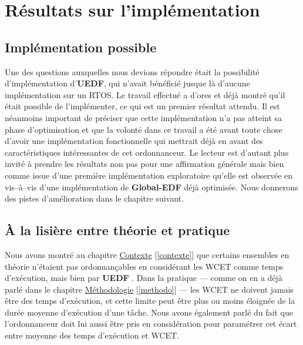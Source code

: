 
\section{Résultats sur l'implémentation}
\label{resultats}

	\subsection{Implémentation possible}
	
	Une des questions auxquelles nous devions répondre était la possibilité d'implémentation d'\textbf{UEDF}, qui 
	n'avait bénéficié jusque là d'aucune implémentation sur un RTOS.
	Le travail effectué a d'ores et déjà montré qu'il était possible de l'implémenter, ce qui est un premier résultat attendu.
	Il est néanmoins important de préciser que cette implémentation n'a pas atteint sa phase d'optimisation 
	et que la volonté dans ce travail a été avant toute chose d'avoir une implémentation fonctionnelle qui mettrait
	déjà en avant des caractéristiques intéressantes de cet ordonnanceur. 
	Le lecteur est d'autant plus invité à prendre les résultats non pas pour une affirmation générale 
	mais bien comme issue d'une première implémentation 
	\og{}exploratoire\fg{} qu'elle est observée en vis--à--vis d'une implémentation de \textbf{Global-EDF} déjà optimisée. 
	Nous donnerons des pistes d'amélioration dans le chapitre suivant. \newline
	
	\subsection{À la lisière entre théorie et pratique}
	
	Nous avons montré au chapitre \hyperref[contexte]{Contexte} [\ref*{contexte}] 
	que certains ensembles en théorie n'étaient pas ordonnançables en considérant les WCET comme temps d'exécution, 
	mais bien par \textbf{UEDF }. 
	Dans la pratique --- comme on en a déjà parlé dans le chapitre \hyperref[methodo]{Méthodologie} [\ref*{methodo}] --- 
	les WCET ne doivent jamais être des temps d'exécution, et cette limite peut être plus ou moins éloignée 
	de la durée moyenne d'exécution d'une tâche. Nous avons également parlé du fait que l'ordonnanceur doit lui aussi
	être pris en considération pour paramétrer cet écart entre moyenne des temps d'exécution et WCET.\newline

